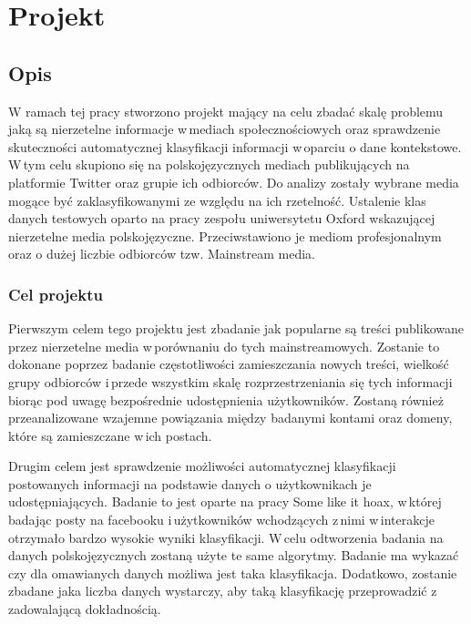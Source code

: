 \newpage
\section{Projekt}
\subsection{Opis}
W ramach tej pracy stworzono projekt mający na celu zbadać skalę problemu jaką są nierzetelne informacje w\,mediach społecznościowych oraz sprawdzenie skuteczności automatycznej klasyfikacji informacji w\,oparciu o dane kontekstowe.  W\,tym celu skupiono się na polskojęzycznych mediach publikujących na platformie Twitter oraz grupie ich odbiorców. Do analizy zostały wybrane media mogące być zaklasyfikowanymi ze względu na ich rzetelność. Ustalenie klas danych testowych oparto na pracy zespołu uniwersytetu Oxford wskazującej nierzetelne media polskojęzyczne. Przeciwstawiono je mediom profesjonalnym oraz o dużej liczbie odbiorców tzw. Mainstream media.
\subsubsection{Cel projektu}
Pierwszym celem tego projektu jest zbadanie jak popularne są treści publikowane przez nierzetelne media w\,porównaniu do tych mainstreamowych. Zostanie to dokonane poprzez badanie częstotliwości zamieszczania nowych treści, wielkość grupy odbiorców i\,przede wszystkim skalę rozprzestrzeniania się tych informacji biorąc pod uwagę bezpośrednie udostępnienia użytkowników. Zostaną również przeanalizowane wzajemne powiązania między badanymi kontami oraz domeny, które są zamieszczane w\,ich postach.
\par
Drugim celem jest sprawdzenie możliwości automatycznej klasyfikacji postowanych informacji na podstawie danych o użytkownikach je udostępniających. Badanie to jest oparte na pracy Some like it hoax, w\,której badając posty na facebooku i\,użytkowników wchodzących z\,nimi w\,interakcje otrzymało bardzo wysokie wyniki klasyfikacji. W\,celu odtworzenia badania na danych polskojęzycznych zostaną użyte te same algorytmy. Badanie ma wykazać czy dla omawianych danych możliwa jest taka klasyfikacja. Dodatkowo, zostanie zbadane jaka liczba danych wystarczy, aby taką klasyfikację przeprowadzić z\,zadowalającą dokładnością. 
